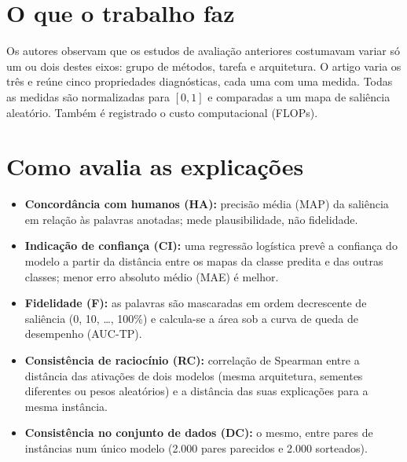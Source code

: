 \documentclass[11pt,a4paper]{article}
\begin{document}
\section{O que o trabalho faz}
Os autores observam que os estudos de avaliação anteriores costumavam variar só um ou dois destes eixos: grupo de métodos, tarefa e arquitetura. O artigo varia os três e reúne cinco propriedades diagnósticas, cada uma com uma medida. Todas as medidas são normalizadas para $[0, 1]$ e comparadas a um mapa de saliência aleatório. Também é registrado o custo computacional (FLOPs).

\section{Como avalia as explicações}
\begin{itemize}
  \item \textbf{Concordância com humanos (HA):} precisão média (MAP) da saliência em relação às palavras anotadas; mede plausibilidade, não fidelidade.
  \item \textbf{Indicação de confiança (CI):} uma regressão logística prevê a confiança do modelo a partir da distância entre os mapas da classe predita e das outras classes; menor erro absoluto médio (MAE) é melhor.
  \item \textbf{Fidelidade (F):} as palavras são mascaradas em ordem decrescente de saliência (0, 10, \ldots, 100\%) e calcula-se a área sob a curva de queda de desempenho (AUC-TP).
  \item \textbf{Consistência de raciocínio (RC):} correlação de Spearman entre a distância das ativações de dois modelos (mesma arquitetura, sementes diferentes ou pesos aleatórios) e a distância das suas explicações para a mesma instância.
  \item \textbf{Consistência no conjunto de dados (DC):} o mesmo, entre pares de instâncias num único modelo (2.000 pares parecidos e 2.000 sorteados).
\end{itemize}
\end{document}
